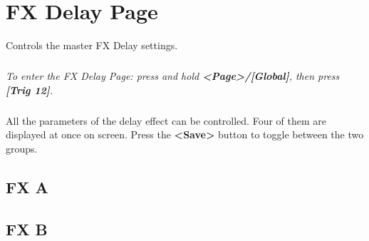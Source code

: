 \chapter{FX Delay Page}

Controls the master FX Delay settings.\\
\vspace{-16pt}
\vspace{-32pt}
\paragraph{}\textit{To enter the FX Delay Page: press and hold \textbf{<Page>/[Global]}, then press \textbf{[Trig 12]}.}
\vspace{-16pt}
\paragraph{}
All the parameters of the delay effect can be controlled. Four of them are displayed at once on screen. Press the \textbf{<Save>} button to toggle between the two groups.

\vspace{-4pt}
\section{FX A}
\vspace{-16pt}
\vspace{-25pt}
\vspace{-10pt}
\section{FX B}
\vspace{-16pt}
\vspace{-25pt}
\begin{figure}[h!]
\end{figure}

